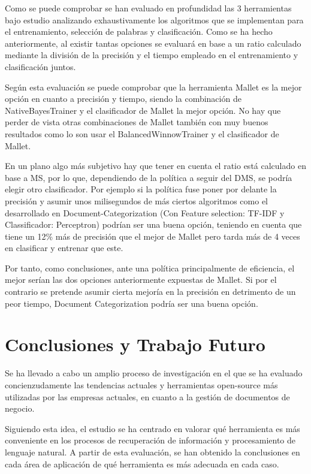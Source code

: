 \documentclass[runningheads,a4paper]{llncs}
\theoremstyle{break}
\begin{document}
\pagebreak 
\vspace{-1.5em}

Como se puede comprobar se han evaluado en profundidad las 3 herramientas bajo estudio analizando exhaustivamente los algoritmos que se implementan para el entrenamiento, selección de palabras y clasificación. Como se ha hecho anteriormente, al existir tantas opciones se evaluará en base a un ratio calculado mediante la división de la precisión y el tiempo empleado en el entrenamiento y clasificación juntos.

Según esta evaluación se puede comprobar que la herramienta Mallet es la mejor opción en cuanto a precisión y tiempo, siendo la combinación de NativeBayesTrainer y el clasificador de Mallet la mejor opción. No hay que perder de vista otras combinaciones de Mallet también con muy buenos resultados como lo son usar el BalancedWinnowTrainer y el clasificador de Mallet.

En un plano algo más subjetivo hay que tener en cuenta el ratio está calculado en base a MS, por lo que, dependiendo de la política a seguir del DMS, se podría elegir otro clasificador. Por ejemplo si la política fuse poner por delante la precisión y asumir unos milisegundos de más ciertos algoritmos como el desarrollado en Document-Categorization (Con Feature selection: TF-IDF y Classificador: Perceptron) podrían ser una buena opción, teniendo en cuenta que tiene un 12\% más de precisión que el mejor de Mallet pero tarda más de 4 veces en clasificar y entrenar que este.

Por tanto, como conclusiones, ante una política principalmente de eficiencia, el mejor serían las dos opciones anteriormente expuestas de Mallet. Si por el contrario se pretende asumir cierta mejoría en la precisión en detrimento de un peor tiempo, Document Categorization podría ser una buena opción.


\section{Conclusiones y Trabajo Futuro}
Se ha llevado a cabo un amplio proceso de investigación en el que se ha evaluado concienzudamente las tendencias actuales y herramientas open-source más utilizadas por las empresas actuales, en cuanto a la gestión de documentos de negocio.

Siguiendo esta idea, el estudio se ha centrado en valorar qué herramienta es más conveniente en los procesos de recuperación de información y procesamiento de lenguaje natural. A partir de esta evaluación, se han obtenido la conclusiones en cada área de aplicación de qué herramienta es más adecuada en cada caso.
\end{document}
